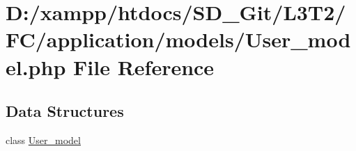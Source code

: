 \hypertarget{_user__model_8php}{}\section{D\+:/xampp/htdocs/\+S\+D\+\_\+\+Git/\+L3\+T2/\+F\+C/application/models/\+User\+\_\+model.php File Reference}
\label{_user__model_8php}
\subsection*{Data Structures}
\begin{DoxyCompactItemize}
\item 
class \hyperlink{class_user__model}{User\+\_\+model}
\end{DoxyCompactItemize}
